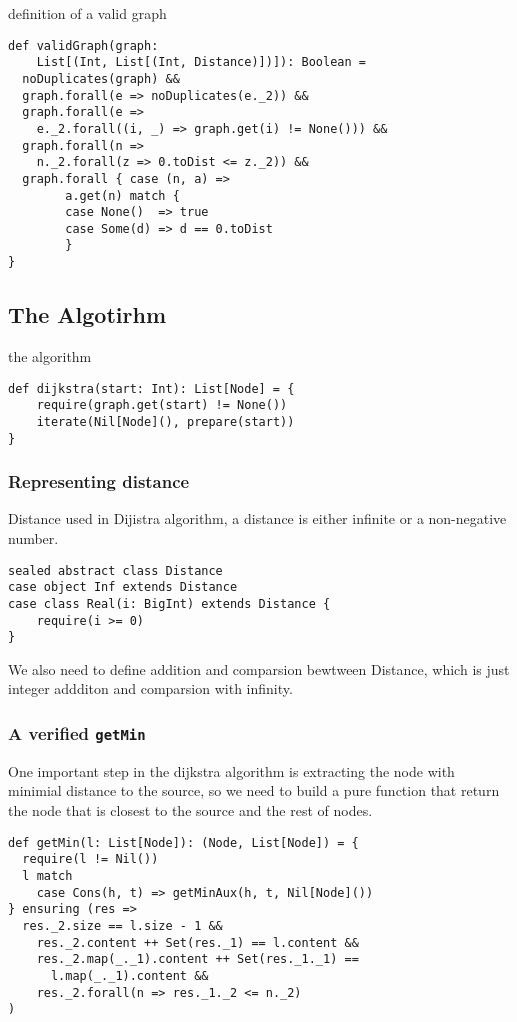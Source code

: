 \documentclass[11pt,a4paper]{article}
\begin{document}
definition of a valid graph

\begin{lstlisting}
def validGraph(graph: 
    List[(Int, List[(Int, Distance)])]): Boolean =
  noDuplicates(graph) &&
  graph.forall(e => noDuplicates(e._2)) &&
  graph.forall(e => 
    e._2.forall((i, _) => graph.get(i) != None())) &&
  graph.forall(n => 
    n._2.forall(z => 0.toDist <= z._2)) &&
  graph.forall { case (n, a) =>
        a.get(n) match {
        case None()  => true
        case Some(d) => d == 0.toDist
        }
}
\end{lstlisting}


\subsection{The Algotirhm}

the algorithm

\begin{lstlisting}
def dijkstra(start: Int): List[Node] = {
    require(graph.get(start) != None())
    iterate(Nil[Node](), prepare(start))
}
\end{lstlisting}

\subsubsection{Representing distance}

Distance used in Dijistra algorithm, 
a distance is either infinite or a non-negative number.


\begin{lstlisting}
sealed abstract class Distance
case object Inf extends Distance
case class Real(i: BigInt) extends Distance { 
    require(i >= 0) 
}
\end{lstlisting}

We also need to define addition and comparsion bewtween Distance, 
which is just integer addditon and comparsion with infinity.

\subsubsection{A verified \texttt{getMin}}

One important step in the dijkstra algorithm is extracting the node with
minimial distance to the source, so we need to build a pure function that
return the node that is closest to the source and the rest of nodes.

\begin{lstlisting}
def getMin(l: List[Node]): (Node, List[Node]) = {
  require(l != Nil())
  l match
    case Cons(h, t) => getMinAux(h, t, Nil[Node]())
} ensuring (res =>
  res._2.size == l.size - 1 &&
    res._2.content ++ Set(res._1) == l.content &&
    res._2.map(_._1).content ++ Set(res._1._1) == 
      l.map(_._1).content &&
    res._2.forall(n => res._1._2 <= n._2)
)
\end{lstlisting}
\end{document}
